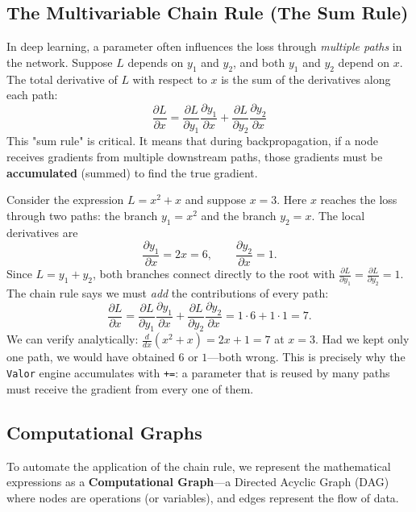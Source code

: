 \documentclass{tufte-handout}
\let\subsubsection\subsection
\begin{document}
\subsubsection{The Multivariable Chain Rule (The Sum Rule)}

In deep learning, a parameter often influences the loss through \textit{multiple paths} in the network. Suppose $L$ depends on $y_1$ and $y_2$, and both $y_1$ and $y_2$ depend on $x$. The total derivative of $L$ with respect to $x$ is the sum of the derivatives along each path:
\[
\frac{\partial L}{\partial x} = \frac{\partial L}{\partial y_1} \frac{\partial y_1}{\partial x} + \frac{\partial L}{\partial y_2} \frac{\partial y_2}{\partial x}
\]
This "sum rule" is critical. It means that during backpropagation, if a node receives gradients from multiple downstream paths, those gradients must be \textbf{accumulated} (summed) to find the true gradient.

\begin{exmp}
Consider the expression $L = x^2 + x$ and suppose $x = 3$. Here $x$ reaches the loss through two paths: the branch $y_1 = x^2$ and the branch $y_2 = x$. The local derivatives are
\[
\frac{\partial y_1}{\partial x} = 2x = 6, \qquad \frac{\partial y_2}{\partial x} = 1.
\]
Since $L = y_1 + y_2$, both branches connect directly to the root with $\frac{\partial L}{\partial y_1} = \frac{\partial L}{\partial y_2} = 1$. The chain rule says we must \emph{add} the contributions of every path:
\[
\frac{\partial L}{\partial x} = \frac{\partial L}{\partial y_1}\frac{\partial y_1}{\partial x} + \frac{\partial L}{\partial y_2}\frac{\partial y_2}{\partial x} = 1 \cdot 6 + 1 \cdot 1 = 7.
\]
We can verify analytically: $\frac{d}{dx}(x^2 + x) = 2x + 1 = 7$ at $x = 3$. Had we kept only one path, we would have obtained $6$ or $1$---both wrong. This is precisely why the \texttt{Valor} engine accumulates with \texttt{+=}: a parameter that is reused by many paths must receive the gradient from every one of them.
\end{exmp}

\subsection{Computational Graphs}

To automate the application of the chain rule, we represent the mathematical expressions as a \textbf{Computational Graph}—a Directed Acyclic Graph (DAG) where nodes are operations (or variables), and edges represent the flow of data.
\end{document}
